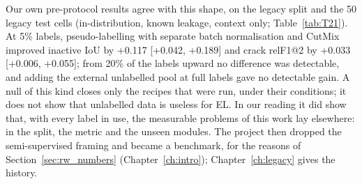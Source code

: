 Our own pre-protocol results agree with this shape, on the legacy split and the 50 legacy test cells (in-distribution, known
leakage, context only; Table~\ref{tab:T21}). At 5\% labels, pseudo-labelling with separate batch normalisation and CutMix
improved inactive IoU by +0.117 [+0.042, +0.189] and crack relF1@2 by +0.033 [+0.006, +0.055]; from 20\% of the labels upward
no difference was detectable, and adding the external unlabelled pool at full labels gave no detectable gain. A null of this kind closes
only the recipes that were run, under their conditions; it does not show that unlabelled data is useless for EL. In our
reading it did show that, with every label in use, the measurable problems of this work lay elsewhere: in the split, the
metric and the unseen modules. The project then dropped the semi-supervised framing and became a benchmark, for the
reasons of Section~\ref{sec:rw_numbers} (Chapter~\ref{ch:intro}); Chapter~\ref{ch:legacy} gives the history.
